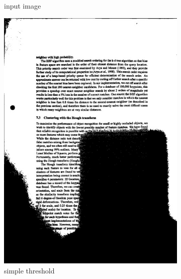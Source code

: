 \documentclass[bibliography=totoc]{scrartcl}
\begin{document}
\begin{figure}[hb!]
\begin{subfigure}[t]{0.3\linewidth}
		\caption{input image}
		\label{subfig:shadow_input}
	\end{subfigure}
	\begin{subfigure}[t]{0.28\linewidth}
		\includegraphics[width=\linewidth]{imgs/threshold/bad_lighting_simple.jpg}
		\caption{simple threshold}
		\label{subfig:simple_thresholding}
	\end{subfigure}
	\begin{subfigure}[t]{0.28\linewidth}

\end{subfigure}
\end{figure}
\end{document}
